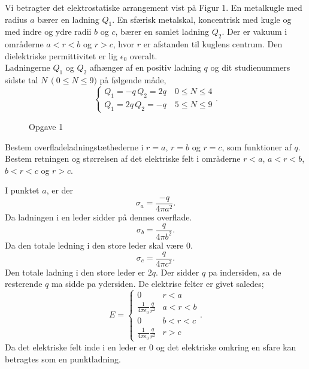 
\title{\vspace{-1cm}\vspace{-1cm}}
\author{}
\date{}


\maketitle
\thispagestyle{fancy}
\begin{exercise}[Opgave 1]
	Vi betragter det elektrostatiske arrangement vist på Figur 1. En metalkugle med radius $a$ bærer en ladning $Q_1$. En sfærisk metalskal, koncentrisk med kugle og med indre og ydre radii $b$ og $c$, bærer en samlet ladning $Q_2$. Der er vakuum i områderne $a<r<b$ og $r>c$, hvor $r$ er afstanden til kuglens centrum. Den dielektriske permittivitet er lig $\epsilon_0$ overalt.\\
	Ladningerne $Q_1$ og $Q_2$ afhænger af en positiv ladning $q$ og dit studienummers sidste tal $N\, \left( 0 \le N\le 9) $ på følgende måde,
		\[
		\begin{cases}
			Q_1 = -q\, Q_2 = 2q \quad 0\le N\le 4\\
			Q_1 = 2q\, Q_2 = -q \quad 5\le N\le 9
		\end{cases}
		.\] 
\end{exercise}
\begin{figure}[ht]
    \centering
    \caption{Opgave 1}
    \label{fig:opgave1}
\end{figure}
\begin{subexercise}[a]
	Bestem overfladeladningstæthederne i $r=a$, $r=b$ og $r=c$, som funktioner af $q$.\\
	Bestem retningen og størrelsen af det elektriske felt i områderne $r<a$, $a<r<b$, $b<r<c$ og $r>c$.
\end{subexercise}
\begin{solution}
	I punktet $a$, er der
	 \[
	\sigma_a = \frac{-q}{4\pi a^2} 
	.\] 
	Da ladningen i en leder sidder på dennes overflade.
	\[
	\sigma_b = \frac{q}{4\pi b^2}
	.\] 
	Da den totale ledning i den store leder skal være $0$.
	 \[
	\sigma_c = \frac{q}{4\pi c^2}
	.\] 
	Den totale ladning i den store leder er $2q$. Der sidder $q$ pa indersiden, sa de resterende $q$ ma sidde pa ydersiden. De elektrise felter er givet saledes;
	\[
		E =
	\begin{cases}
		0 & r<a \\
		\frac{1}{4\pi\epsilon_0}\frac{q}{r^2} & a<r<b \\
		0 & b<r<c \\
		\frac{1}{4\pi\epsilon_0} \frac{q}{r^2} & r>c
	\end{cases}
	.\] 
	Da det elektriske felt inde i en leder er $0$ og det elektriske omkring en sfare kan betragtes som en punktladning. 
\end{solution}
